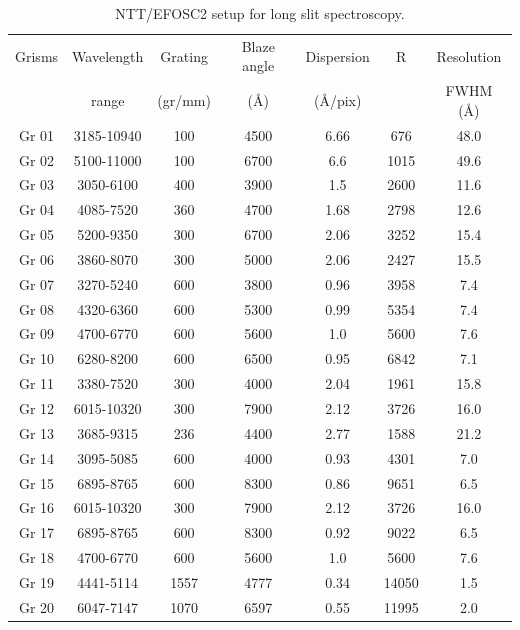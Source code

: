 \begin{table}
\begin{center}
\caption{NTT/EFOSC2 setup for long slit spectroscopy.}
\begin{tabular}{|c|c|c|c|c|c|c|}
\hline
Grisms & Wavelength  & Grating  & Blaze angle & Dispersion  & R & Resolution  \\ 
  & range  & (gr/mm)   & (\AA) & (\AA/pix)   &  & FWHM (\AA)  \\ \hline
  Gr 01 & 3185-10940  & 100   &    4500   & 6.66 & 676 & 48.0  \\ \hline
  Gr 02 & 5100-11000  & 100    &   6700  &  6.6 & 1015 & 49.6  \\ \hline
  Gr 03  & 3050-6100   & 400    &   3900   & 1.5 & 2600 & 11.6  \\ \hline
  Gr 04  & 4085-7520   & 360    &   4700   & 1.68 &  2798 & 12.6  \\ \hline
  Gr 05  & 5200-9350   & 300    &   6700  &  2.06 &  3252 & 15.4  \\ \hline
  Gr 06  & 3860-8070   & 300   &    5000  &  2.06 &  2427 & 15.5  \\ \hline
  Gr 07  & 3270-5240   & 600    &   3800  &  0.96 &  3958 & 7.4   \\ \hline
  Gr 08 &  4320-6360  &  600    &   5300  &  0.99 &  5354 & 7.4   \\ \hline
  Gr 09  & 4700-6770   & 600   &    5600  &  1.0  &  5600 & 7.6   \\ \hline
  Gr 10  & 6280-8200   & 600   &    6500  &  0.95  & 6842 & 7.1   \\ \hline
  Gr 11  & 3380-7520   & 300    &   4000 &   2.04  & 1961 & 15.8  \\ \hline
  Gr 12  & 6015-10320  & 300   &    7900  &  2.12 &  3726 & 16.0  \\ \hline
  Gr 13  & 3685-9315   & 236    &   4400   & 2.77 &  1588 & 21.2  \\ \hline
  Gr 14  & 3095-5085   & 600   &    4000  &  0.93  & 4301 & 7.0   \\ \hline
  Gr 15  & 6895-8765   & 600    &   8300  &  0.86  & 9651 & 6.5   \\ \hline
  Gr 16  & 6015-10320 &  300    &   7900  &  2.12  & 3726 & 16.0  \\ \hline
  Gr 17  & 6895-8765  &  600     &  8300  &  0.92  & 9022 & 6.5   \\ \hline
  Gr 18  & 4700-6770 & 600    &   5600 &   1.0  &  5600 & 7.6   \\ \hline
  Gr 19  & 4441-5114 & 1557   &   4777 &   0.34  & 14050  & 1.5   \\ \hline
   Gr 20  & 6047-7147 & 1070 & 6597 & 0.55 & 11995 & 2.0   \\ 
  \hline
\end{tabular}

\label{tab2:ntt}
\end{center}
\end{table}


